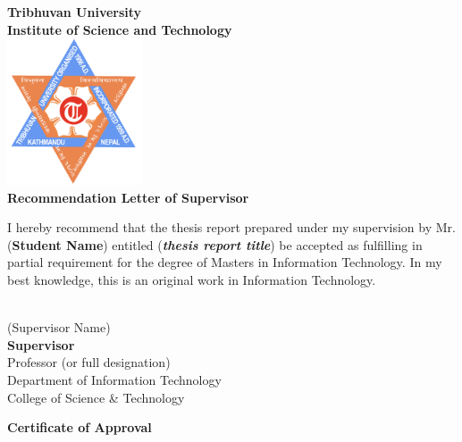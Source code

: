 \newpage
\begin{center}
    \onehalfspacing
    \large
   \textbf{\Huge Tribhuvan University}\\
    \textbf{\Large Institute of Science and Technology}\\
    \vspace{1cm}
    \includegraphics[width=0.3\textwidth]{Pictures/TU Logo.png} \\
    \vspace{1cm}
    \textbf{Recommendation Letter of Supervisor} \\
    \vspace{2cm}
\end{center}

\noindent
I hereby recommend that the thesis report prepared under my supervision by Mr. (\textbf{Student Name}) entitled (\textbf{\textit{thesis report title}}) be accepted as fulfilling in partial requirement for the degree of Masters in Information Technology. In my best knowledge, this is an original work in Information Technology.

\vspace{5cm}

\noindent
\begin{tabbing}
    \makebox[8cm]{\dotfill} \\
    (Supervisor Name) \\
    \textbf{Supervisor} \\
    Professor (or full designation) \\
    Department of Information Technology \\
    College of Science \& Technology\\
    
\end{tabbing}

\newpage
\begin{center}
    \onehalfspacing
    \large
    \textbf{Certificate of Approval} \\
    \vspace{1cm}
\end{center}

